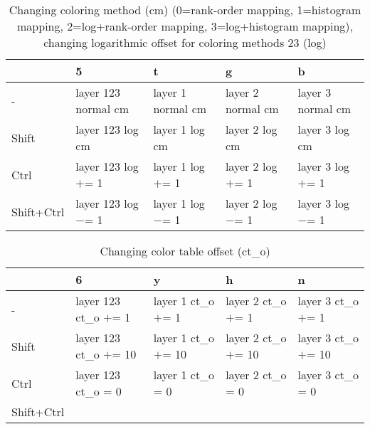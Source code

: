 \documentclass[10pt,a4paper]{article}
\begin{document}
\begin{table}[h!]
    \caption{Changing coloring method (cm) (0=rank-order mapping, 1=histogram mapping, 2=log+rank-order mapping, 3=log+histogram mapping), changing logarithmic offset for coloring methods 23 (log)}
    \setlength{\tabcolsep}{0.0pt}
    \begin{tabularx}{\linewidth}{LLLLL}
        \toprule
                   & 5                    & t                  & g                  & b                  \\
        \midrule                                                                          
        -          & layer 123 normal cm  & layer 1 normal cm  & layer 2 normal cm  & layer 3 normal cm  \\
        Shift      & layer 123 log cm     & layer 1 log cm     & layer 2 log cm     & layer 3 log cm     \\
        Ctrl       & layer 123 log $+$= 1 & layer 1 log $+$= 1 & layer 2 log $+$= 1 & layer 3 log $+$= 1 \\
        Shift+Ctrl & layer 123 log $-$= 1 & layer 1 log $-$= 1 & layer 2 log $-$= 1 & layer 3 log $-$= 1 \\
        \bottomrule
    \end{tabularx}
\end{table}

\begin{table}[h!]
    \caption{Changing color table offset (ct\_o)}
    \setlength{\tabcolsep}{0.0pt}
    \begin{tabularx}{\linewidth}{LLLLL}
        \toprule
                   & 6                       & y                     & h                     & n                     \\
        \midrule                                                                          
        -          & layer 123 ct\_o $+$= 1  & layer 1 ct\_o $+$= 1  & layer 2 ct\_o $+$= 1  & layer 3 ct\_o $+$= 1  \\
        Shift      & layer 123 ct\_o $+$= 10 & layer 1 ct\_o $+$= 10 & layer 2 ct\_o $+$= 10 & layer 3 ct\_o $+$= 10 \\
        Ctrl       & layer 123 ct\_o = 0     & layer 1 ct\_o = 0     & layer 2 ct\_o = 0     & layer 3 ct\_o = 0     \\
        Shift+Ctrl &                         &                       &                       &                       \\
        \bottomrule
    \end{tabularx}
\end{table}
\end{document}
